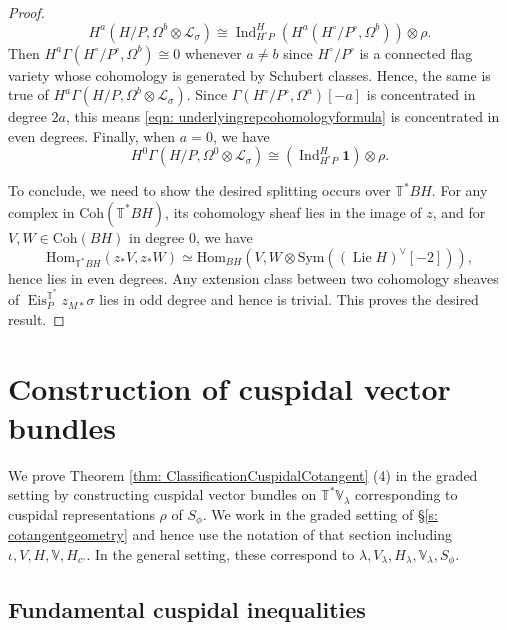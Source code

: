 \documentclass{amsart}
\theoremstyle{definition}
\theoremstyle{remark}
\numberwithin{equation}{section}
\DeclareMathOperator{\Lie}{Lie}
\DeclareMathOperator{\Ind}{Ind}
\newcommand{\mc}{\mathcal}
\newcommand{\Hom}{\mathrm{Hom}}
\newcommand{\Sym}{\mathrm{Sym}}
\DeclareMathOperator{\Eis}{\mathrm{Eis}}
\newcommand{\Coh}{\mathrm{Coh}}
\newcommand{\V}{\mathbb{V}}
\newcommand{\T}{\mathbb{T}}
\begin{document}
\begin{proof}
\begin{equation*}
    H^a(H/P, \Omega^b \otimes \mc{L}_{\sigma}) \cong \Ind^{H}_{H^{\circ}P} (H^a(H^{\circ}/P^{\circ}, \Omega^b)) \otimes \rho.
\end{equation*}
Then $H^a\Gamma(H^{\circ}/P^{\circ}, \Omega^b) \cong 0$ whenever $a \neq b$ since $H^{\circ}/P^{\circ}$ is a connected flag variety whose cohomology is generated by Schubert classes. Hence, the same is true of $H^a\Gamma(H/P, \Omega^b \otimes \mc{L}_{\sigma})$. Since $\Gamma(H^{\circ}/P^{\circ}, \Omega^a)[-a]$ is concentrated in degree $2a$, this means \eqref{eqn: underlyingrepcohomologyformula} is concentrated in even degrees. Finally, when $a=0$, we have 
\begin{equation*}
    H^0\Gamma(H/P, \Omega^0 \otimes \mc{L}_{\sigma}) \cong (\Ind^{H}_{H^\circ P} \mathbf{1}) \otimes \rho.
\end{equation*}

To conclude, we need to show the desired splitting occurs over $\T^{\ast} BH$. For any complex in $\Coh(\T^{\ast}BH)$, its cohomology sheaf lies in the image of $z$, and for $V, W \in \Coh(BH)$ in degree 0, we have
\begin{equation*}
    \Hom_{\T^{\ast} BH}(z_{\ast} V , z_{\ast} W) \simeq \Hom_{BH}(V , W\otimes \Sym((\Lie H)^\vee[-2])),
\end{equation*}
hence lies in even degrees. Any extension class between two cohomology sheaves of $\Eis^{\T^{\ast}}_P z_{M \ast} \sigma$ lies in odd degree and hence is trivial. This proves the desired result.
\end{proof}

\section{Construction of cuspidal vector bundles}{\label{s: CVBs}}
We prove Theorem \ref{thm: ClassificationCuspidalCotangent} (4) in the graded setting by constructing cuspidal vector bundles on $\T^* \V_\lambda$ corresponding to cuspidal representations $\rho$ of $S_\phi$. We work in the graded setting of \S \ref{s: cotangentgeometry} and hence use the notation of that section including $\iota, V,H,\V, H_{c^{\circ}}$. In the general setting, these correspond to $\lambda, V_{\lambda}, H_{\lambda}, \V_{\lambda}, S_{\phi}$.

\subsection{Fundamental cuspidal inequalities}{\label{ss: fundcuspineq}}
\end{document}
